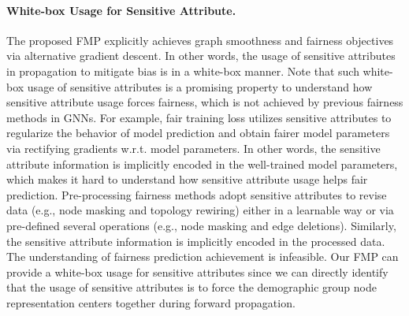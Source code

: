 \documentclass[letterpaper]{article} %
\theoremstyle{plain}
\theoremstyle{definition}
\theoremstyle{remark}
\begin{document}
\paragraph{White-box Usage for Sensitive Attribute.} The proposed FMP explicitly achieves graph smoothness and fairness objectives via alternative gradient descent. In other words, the usage of sensitive attributes in propagation to mitigate bias is in a white-box manner. Note that such white-box usage of sensitive attributes is a promising property to understand how sensitive attribute usage forces fairness, which is not achieved by previous fairness methods in GNNs. For example, fair training loss utilizes sensitive attributes to regularize the behavior of model prediction and obtain fairer model parameters via rectifying gradients w.r.t. model parameters. In other words, the sensitive attribute information is implicitly encoded in the well-trained model parameters, which makes it hard to understand how sensitive attribute usage helps fair prediction.  Pre-processing fairness methods adopt sensitive attributes to revise data (e.g., node masking and topology rewiring) either in a learnable way or via pre-defined several operations (e.g., node masking and edge deletions). Similarly, the sensitive attribute information is implicitly encoded in the processed data. The understanding of fairness prediction achievement is infeasible. Our FMP can provide a white-box usage for sensitive attributes since we can directly identify that the usage of sensitive attributes is to force the demographic group node representation centers together during forward propagation.
\end{document}
